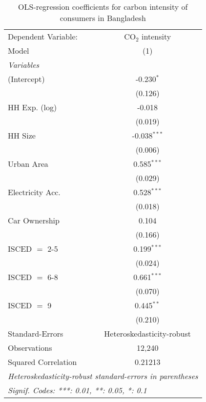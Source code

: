 
\begin{table}[htbp!]
   \centering
   \small
   \begin{adjustbox}{width = 1\textwidth, max height = 0.95\textheight, center}
      \begin{threeparttable}[b]
         \caption{\label{tab:OLS_1_BGD} OLS-regression coefficients for carbon intensity of consumers in Bangladesh}
         \begin{tabular}{lc}
            \tabularnewline \midrule \midrule
            Dependent Variable: & CO$_{2}$ intensity\\  
            Model               & (1)\\  
            \midrule
            \emph{Variables}\\
            (Intercept)         & -0.230$^{*}$\\   
                                & (0.126)\\   
            HH Exp. (log)       & -0.018\\   
                                & (0.019)\\   
            HH Size             & -0.038$^{***}$\\   
                                & (0.006)\\   
            Urban Area          & 0.585$^{***}$\\   
                                & (0.029)\\   
            Electricity Acc.    & 0.528$^{***}$\\   
                                & (0.018)\\   
            Car Ownership       & 0.104\\   
                                & (0.166)\\   
            ISCED $=$ 2-5       & 0.199$^{***}$\\   
                                & (0.024)\\   
            ISCED $=$ 6-8       & 0.661$^{***}$\\   
                                & (0.070)\\   
            ISCED $=$ 9         & 0.445$^{**}$\\   
                                & (0.210)\\   
            \midrule 
            Standard-Errors     & Heteroskedasticity-robust \\   
            Observations        & 12,240\\  
            Squared Correlation & 0.21213\\  
            \midrule \midrule
            \multicolumn{2}{l}{\emph{Heteroskedasticity-robust standard-errors in parentheses}}\\
            \multicolumn{2}{l}{\emph{Signif. Codes: ***: 0.01, **: 0.05, *: 0.1}}\\
         \end{tabular}
         

\end{threeparttable}
\end{adjustbox}
\end{table}
